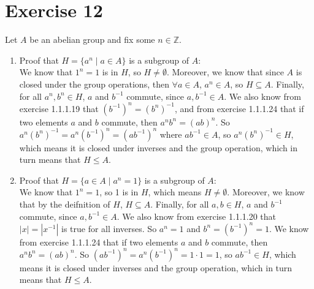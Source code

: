 \documentclass[12pt]{article}
\newcommand{\Z}{\mathbb{Z}}
\begin{document}
    \section*{Exercise 12}
    Let $A$ be an abelian group and fix some $n \in \Z$. \\
    \begin{enumerate}[label=\textbf{\alph*.}]
        \item 
            Proof that $H = \{a^n \mid a \in A\}$ is a subgroup of $A$: \\
            We know that $1^n = 1$ is in $H$, so $H \neq \emptyset$.
            Moreover, we know that since $A$ is closed under
            the group operations,
            then $\forall a \in A$, $a^n \in A$,
            so $H \subseteq A$.
            Finally, for all $a^n, b^n \in H$, $a$ and $b^{-1}$ commute,
            since $a, b^{-1} \in A$.
            We also know from exercise 1.1.1.19
            that $(b^{-1})^n = (b^n)^{-1}$,
            and from exercise 1.1.1.24 that if two elements $a$ and $b$
            commute, then $a^nb^n = (ab)^n$.
            So $a^n(b^n)^{-1} = a^n(b^{-1})^n = (ab^{-1})^n$
            where $ab^{-1} \in A$,
            so $a^n(b^n)^{-1} \in H$,
            which means it is closed under inverses and the group operation,
            which in turn means that $H \leqslant A$.
        \item
            Proof that $H = \{a \in A \mid a^n = 1\}$ is a subgroup of $A$: \\
            We know that $1^n = 1$, so 1 is in $H$,
            which means $H \neq \emptyset$.
            Moreover, we know that by the deifnition of $H$,
            $H \subseteq A$.
            Finally, for all $a, b \in H$, $a$ and $b^{-1}$ commute,
            since $a, b^{-1} \in A$.
            We also know from exercise 1.1.1.20 that $|x| = |x^{-1}|$
            is true for all inverses.
            So $a^n = 1$ and $b^n = (b^{-1})^n = 1$.
            We know from exercise 1.1.1.24 that if two elements $a$ and $b$
            commute, then $a^nb^n = (ab)^n$.
            So $(ab^{-1})^n = a^n(b^{-1})^n = 1 \cdot 1 = 1$,
            so $ab^{-1} \in H$,
            which means it is closed under inverses and the group operation,
            which in turn means that $H \leqslant A$.
    \end{enumerate}
\end{document}
